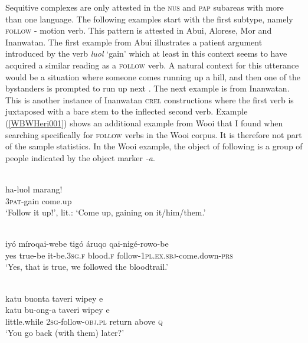 Sequitive complexes are only attested in the \textsc{nus} and \textsc{pap} subareas with more than one language. The following examples start with the first subtype, namely \textsc{follow} - motion verb. This pattern is attested in Abui, Alorese, Mor and Inanwatan. The first example from Abui illustrates a patient argument introduced by the verb \textit{luol} `gain' which at least in this context seems to have acquired a similar reading as a \textsc{follow} verb. A natural context for this utterance would be a situation where someone comes running up a hill, and then one of the bystanders is prompted to run up next \citep[362]{kratochvil2007grammar}. The next example is from Inanwatan. This is another instance of Inanwatan \textsc{crel} constructions where the first verb is juxtaposed with a bare stem to the inflected second verb. Example (\ref{WBWHeri001}) shows an additional example from Wooi that I found when searching specifically for \textsc{follow} verbs in the Wooi corpus. It is therefore not part of the sample statistics. In the Wooi example, the object of following is a group of people indicated by the object marker \textit{-a}.

\ea \label{Abui059}
\\
\gll ha-luol marang! \\
\textsc{3}\textsc{pat}-gain come.up \\
\glft `Follow it up!’, lit.: `Come up, gaining on it/him/them.’ \\ 
\z

\ea \label{Inanwatan026}
\\
\gll iyó míroqai-webe tigó áruqo qai-nigé-rowo-be \\
yes true-be it-be.\textsc{3}\textsc{sg}.\textsc{f} blood.\textsc{f} follow-\textsc{1}\textsc{pl}.\textsc{ex}.\textsc{sbj}-come.down-\textsc{prs} \\
\glft `Yes, that is true, we followed the bloodtrail.'\\ 
\z

\ea \label{WBWHeri001}
\\
\glll katu buonta taveri wipey e \\
katu bu-ong-a taveri wipey e \\
little.while \textsc{2}\textsc{sg}-follow-\textsc{obj}.\textsc{pl} return above \textsc{q} \\
\glft `You go back (with them) later?' \\ 
\z

